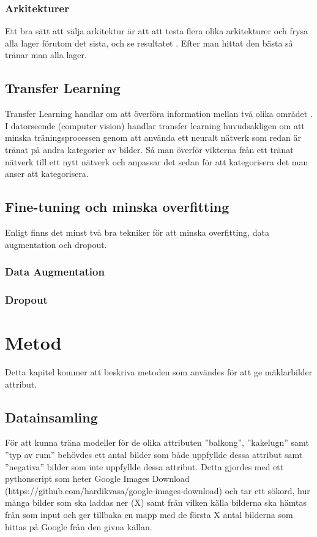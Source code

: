 \documentclass{kththesis}
\begin{document}
  

    \subsection{Arkitekturer}
    Ett bra sätt att välja arkitektur är att att testa flera olika arkitekturer och frysa alla lager förutom det sista, och se resultatet \parencite{Goodfellow-et-al-2016}. Efter man hittat den bästa så tränar man alla lager.

  \section{Transfer Learning}
  Transfer Learning handlar om att överföra information mellan två olika området \parencite{oquab_learning_2014}. I datorseende (computer vision) handlar transfer learning huvudsakligen om att minska träningsprocessen genom att använda ett neuralt nätverk som redan är tränat på andra kategorier av bilder. Så man överför vikterna från ett tränat nätverk till ett nytt nätverk och anpassar det sedan för att kategorisera det man anser att kategorisera.

  \section{Fine-tuning och minska overfitting}
  Enligt \cite{krizhevsky_imagenet_2012} finns det minst två bra tekniker för att minska overfitting, data augmentation och dropout.

    \subsection{Data Augmentation}

    \subsection{Dropout}

\chapter{Metod}
Detta kapitel kommer att beskriva metoden som användes för att ge mäklarbilder attribut.


\section{Datainsamling}
För att kunna träna modeller för de olika attributen ”balkong”, ”kakelugn” samt ”typ av rum” behövdes ett antal bilder som både uppfyllde dessa attribut samt ”negativa” bilder som inte uppfyllde dessa attribut.
Detta gjordes med ett pythonscript som heter Google Images Download (https://github.com/hardikvasa/google-images-download) och tar ett sökord, hur många bilder som ska laddas ner (X) samt från vilken källa bilderna ska hämtas från som input och ger tillbaka en mapp med de första X antal bilderna som hittas på Google från den givna källan. 
\end{document}
